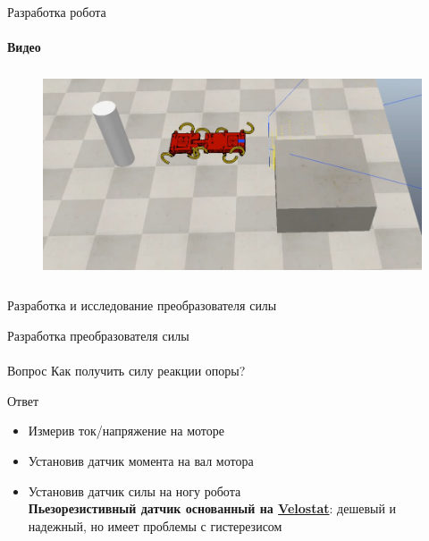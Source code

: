 \documentclass[aspectratio=169,xcolor=table]{beamer}
\begin{document}
\begin{frame}[t]{Разработка робота}
    \framesubtitle{Видео}
    \vspace{-0.6cm}
    \begin{figure}[H]
        \href{https://youtu.be/EQ6oGZVDpoc}{
            \centering\includegraphics[height=6cm,width=1\textwidth,keepaspectratio]{sidestep_segment_video_preview.png}}
    \end{figure}
\end{frame}

\begin{frame}[c]{}
    \framesubtitle{}
    \centering\LARGE Разработка и исследование преобразователя силы
\end{frame}

\begin{frame}[t]{Разработка преобразователя силы}
    \framesubtitle{}
    {\large\begin{block}{Вопрос}
            Как получить силу реакции опоры?
        \end{block}}
    {\large\begin{alertblock}{Ответ}
            \vspace{-0.2cm}

            \begin{itemize}
                \color{lightgray}
                \item Измерив ток/напряжение на моторе
                \item Установив датчик момента на вал мотора
                \item {\color{black} Установив датчик силы на ногу робота \\  \alert{\textbf{Пьезорезистивный датчик основанный на \underline{Velostat}}: дешевый и надежный, но имеет проблемы с гистерезисом}}
            \end{itemize}
        \end{alertblock}}
\end{frame}
\end{document}
